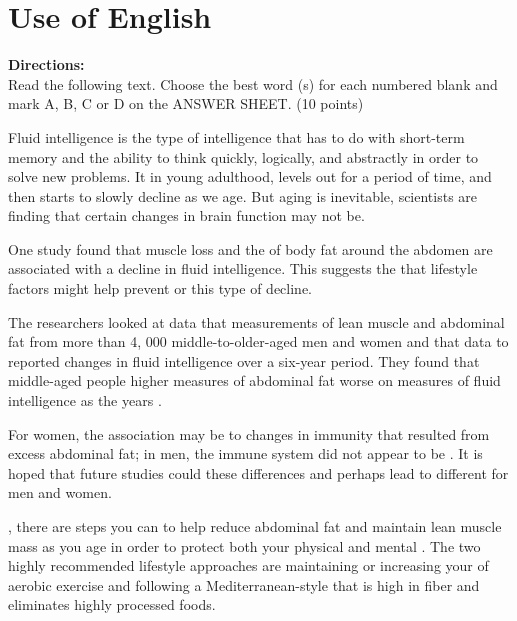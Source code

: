 


\section{Use of English}

\noindent
\textbf{Directions:}\\
Read the following text. Choose the best word (s) for each numbered
	blank and mark A, B, C or D on the ANSWER SHEET.
	(10 points)


\TiGanSpace



	Fluid intelligence is the type of intelligence that has to do with
	short-term memory and the ability to think quickly, logically, and
	abstractly in order to solve new problems. It \cloze in young
	adulthood, levels out for a period of time, and then \cloze starts to
	slowly decline as we age. But \cloze aging is inevitable, scientists
	are finding that certain changes in brain function may not be.
	
	One study found that muscle loss and the \cloze of body fat around the
	abdomen are associated with a decline in fluid intelligence. This
	suggests the \cloze that lifestyle factors might help prevent or
	\cloze this type of decline.
	
	The researchers looked at data that \cloze measurements of lean
	muscle and abdominal
	fat from more than 4, 000 middle-to-older-aged men and women and
	\cloze that data to reported changes in fluid intelligence over a
	six-year period. They found that middle-aged people
	\cloze higher measures of abdominal fat \cloze worse on
	measures of fluid intelligence as the years \cloze.
	
	For women, the association may be \cloze to changes in immunity
	that resulted from excess abdominal fat; in men, the immune system did
	not appear to be \cloze. It is hoped that future studies could
	\cloze these differences and perhaps lead to different
	\cloze for men and women.
	
	\cloze , there are steps you can \cloze to help reduce
	abdominal fat and maintain lean muscle mass as you age in order to
	protect both your physical and mental \cloze. The two highly
	recommended lifestyle approaches are maintaining or increasing your
	\cloze of aerobic exercise and following a Mediterranean-style
	\cloze that is high in fiber and eliminates highly processed
	foods.


\newpage

